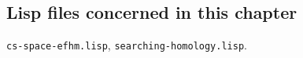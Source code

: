 \subsection* {Lisp files concerned in this chapter}

{\tt cs-space-efhm.lisp}, {\tt searching-homology.lisp}.


